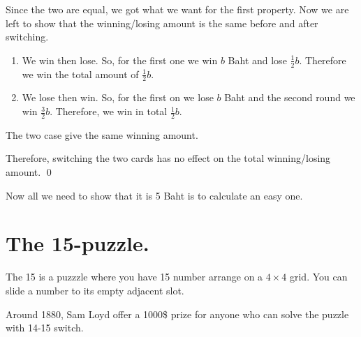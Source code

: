 \documentclass[a4paper, 12pt]{article}
\newcommand{\half}{\frac{1}{2}}
\newcommand{\qedd}{\qed\newline}
\theoremstyle{examplestyle}
\begin{document}
\begin{multicols}{2}
Since the two are equal, we got what we want for the first property. Now we are left to show that the winning/losing amount is the same before and after switching.

\begin{enumerate}
	\item We win then lose. So, for the first one we win $b$ Baht and lose $\half b$. Therefore we win the total amount of $\half b$.
	\item We lose then win. So, for the first on we lose $b$ Baht and the second round we win $\frac{3}{2} b$. Therefore, we win in total $\half b$.
\end{enumerate}
The two case give the same winning amount.

Therefore, switching the two cards has no effect on the total winning/losing amount. \qedd

Now all we need to show that it is 5 Baht is to calculate an easy one.

\section*{The 15-puzzle.}
The 15 is a puzzzle where you have 15 number arrange on a $4\times4$ grid. You can slide a number to its empty adjacent slot. 
\begin{center}
\end{center}

Around 1880, Sam Loyd offer a 1000\$ prize for anyone who can solve the puzzle with 14-15 switch.


\end{multicols}
\end{document}
